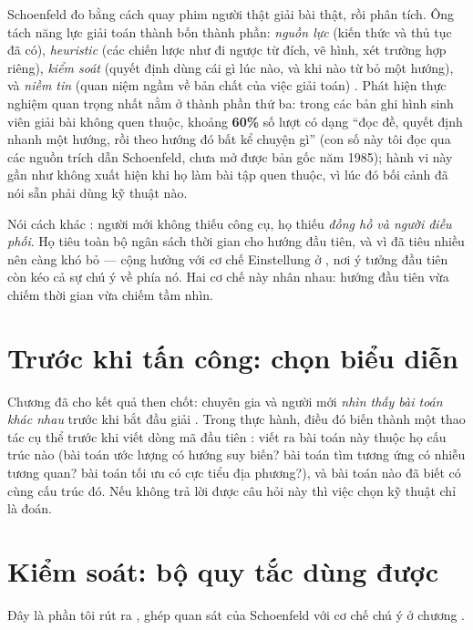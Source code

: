 \documentclass[../hieu-suat.tex]{subfiles}
\begin{document}
Schoenfeld \cite{schoenfeld1985} đo bằng cách quay phim người thật giải bài thật, rồi phân tích. Ông tách năng lực giải toán thành bốn thành phần: \emph{nguồn lực} (kiến thức và thủ tục đã có), \emph{heuristic} (các chiến lược như đi ngược từ đích, vẽ hình, xét trường hợp riêng), \emph{kiểm soát} (quyết định dùng cái gì lúc nào, và khi nào từ bỏ một hướng), và \emph{niềm tin} (quan niệm ngầm về bản chất của việc giải toán) \nT{}. Phát hiện thực nghiệm quan trọng nhất nằm ở thành phần thứ ba: trong các bản ghi hình sinh viên giải bài không quen thuộc, khoảng \textbf{60\%} số lượt có dạng ``đọc đề, quyết định nhanh một hướng, rồi theo hướng đó bất kể chuyện gì'' \nD{} (con số này tôi đọc qua các nguồn trích dẫn Schoenfeld, chưa mở được bản gốc năm 1985); hành vi này gần như không xuất hiện khi họ làm bài tập quen thuộc, vì lúc đó bối cảnh đã nói sẵn phải dùng kỹ thuật nào.

\begin{trucgiac}
Nói cách khác \nM{}: người mới không thiếu công cụ, họ thiếu \emph{đồng hồ và người điều phối}. Họ tiêu toàn bộ ngân sách thời gian cho hướng đầu tiên, và vì đã tiêu nhiều nên càng khó bỏ --- cộng hưởng với cơ chế Einstellung ở , nơi ý tưởng đầu tiên còn kéo cả sự chú ý về phía nó. Hai cơ chế này nhân nhau: hướng đầu tiên vừa chiếm thời gian vừa chiếm tầm nhìn.
\end{trucgiac}

\section{Trước khi tấn công: chọn biểu diễn}

Chương  đã cho kết quả then chốt: chuyên gia và người mới \emph{nhìn thấy bài toán khác nhau} trước khi bắt đầu giải \cite{chi1981}. Trong thực hành, điều đó biến thành một thao tác cụ thể trước khi viết dòng mã đầu tiên \nM{}: viết ra bài toán này thuộc họ cấu trúc nào (bài toán ước lượng có hướng suy biến? bài toán tìm tương ứng có nhiễu tương quan? bài toán tối ưu có cực tiểu địa phương?), và bài toán nào đã biết có cùng cấu trúc đó. Nếu không trả lời được câu hỏi này thì việc chọn kỹ thuật chỉ là đoán.

\section{Kiểm soát: bộ quy tắc dùng được}

Đây là phần tôi rút ra \nM{}, ghép quan sát của Schoenfeld với cơ chế chú ý ở chương .
\end{document}
